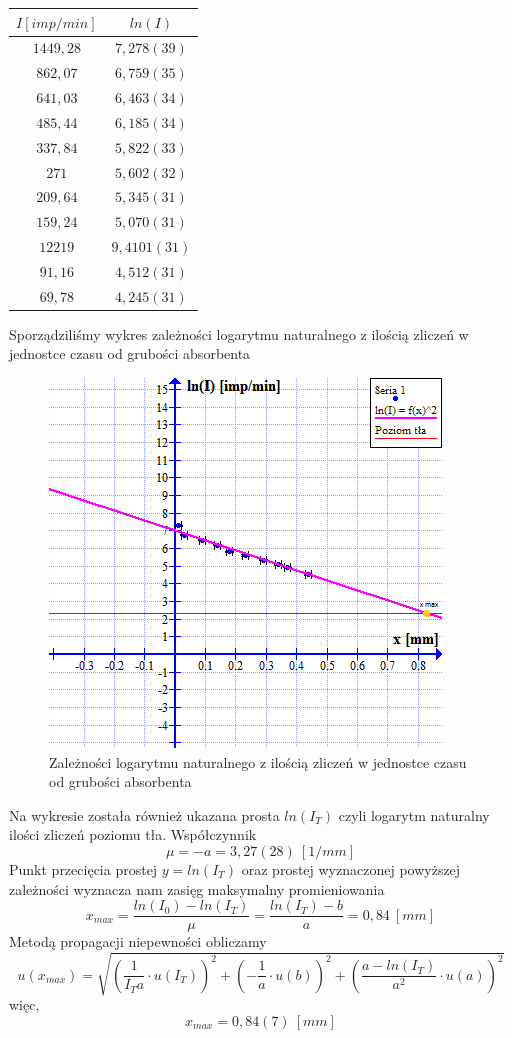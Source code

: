 \documentclass{article}
\begin{document}
\begin{center}
    \begin{tabular}{|c|c|}
        \hline 
        $I [imp/min]$ & $ln(I)$ \\ \hline
        $1449,28$ & $7,278(39)$ \\ \hline
        $862,07$ & $6,759(35)$ \\ \hline
        $641,03$ & $6,463(34)$ \\ \hline
        $485,44$ & $6,185(34)$ \\ \hline
        $337,84$ & $5,822(33)$ \\ \hline
        $271$ & $5,602(32)$ \\ \hline
        $209,64$ & $5,345(31)$ \\ \hline
        $159,24$ & $5,070(31)$ \\ \hline
        $12219$ & $9,4101(31)$ \\ \hline
        $91,16$ & $4,512(31)$ \\ \hline
        $69,78$ & $4,245(31)$ \\ \hline  
    \end{tabular}
\end{center}
Sporządziliśmy wykres zależności logarytmu naturalnego z ilością zliczeń w jednostce czasu od grubości absorbenta
\begin{figure}[ht]
\caption{Zależności logarytmu naturalnego z ilością zliczeń w jednostce czasu od grubości absorbenta}
\centering
\includegraphics{wykres_2.png}
\end{figure}
Na wykresie została również ukazana prosta $ln(I_T)$ czyli logarytm naturalny ilości zliczeń poziomu tła.
Współczynnik 
$$\mu = -a = 3,27(28)\ [1/mm]$$
Punkt przecięcia prostej $y = ln(I_T)$ oraz prostej wyznaczonej powyższej zależności wyznacza nam zasięg maksymalny promieniowania 
$$x_{max} = \frac{ln(I_0) - ln(I_T)}{\mu} = \frac{ln(I_T) - b}{a} = 0,84\ [mm]$$
Metodą propagacji niepewności obliczamy 
$$u(x_{max}) = \sqrt{(\frac{1}{I_Ta} \cdot u(I_T))^2 + (-\frac{1}{a} \cdot u(b))^2 + (\frac{a - ln(I_T)}{a^2} \cdot u(a))^2}$$
więc,
$$x_{max} = 0,84(7)\ [mm]$$
\end{document}

